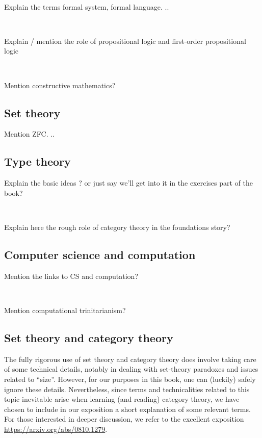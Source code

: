 \

Explain the terms formal system, formal language.
..

\

Explain / mention the role of propositional logic and first-order propositional logic

\

Mention constructive mathematics?

\subsection{Set theory}

Mention ZFC.
..

\subsection{Type theory}

Explain the basic ideas ?
or just say we'll get into it in the exercises part of the book?

\

Explain here the rough role of category theory in the foundations story?

\subsection{Computer science and computation}

Mention the links to CS and computation?

\

Mention computational trinitarianism?

\subsection{Set theory and category theory}

The fully rigorous use of set theory and category theory does involve taking care of some technical details, notably in dealing with set-theory paradoxes and issues related to ``size''.
However, for our purposes in this book, one can (luckily) safely ignore these details.
Nevertheless, since terms and technicalities related to this topic inevitable arise when learning (and reading) category theory, we have chosen to include in our exposition a short explanation of some relevant terms.
For those interested in deeper discussion, we refer to the excellent exposition \url{https://arxiv.org/abs/0810.1279}.


